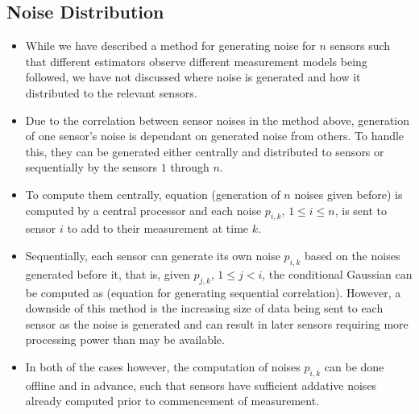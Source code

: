 \documentclass[conference]{IEEEtran}
\begin{document}
\subsection{Noise Distribution}\label{subsec:noise_dist}
\begin{itemize}
  \item While we have described a method for generating noise for $n$ sensors such that different estimators observe different measurement models being followed, we have not discussed where noise is generated and how it distributed to the relevant sensors.
  \item Due to the correlation between sensor noises in the method above, generation of one sensor's noise is dependant on generated noise from others. To handle this, they can be generated either centrally and distributed to sensors or sequentially by the sensors $1$ through $n$.
  \item To compute them centrally, equation (generation of $n$ noises given before) is computed by a central processor and each noise $p_{i,k}$, $1\leq i \leq n$, is sent to sensor $i$ to add to their measurement at time $k$.
  \item Sequentially, each sensor can generate its own noise $p_{i,k}$ based on the noises generated before it, that is, given $p_{j,k}$, $1\leq j<i$, the conditional Gaussian can be computed as (equation for generating sequential correlation). However, a downside of this method is the increasing size of data being sent to each sensor as the noise is generated and can result in later sensors requiring more processing power than may be available.
  \item In both of the cases however, the computation of noises $p_{i,k}$ can be done offline and in advance, such that sensors have sufficient addative noises already computed prior to commencement of measurement.
\end{itemize}

% 
%                                                                   
%                                                                   
%                                                                   
% 
\end{document}
